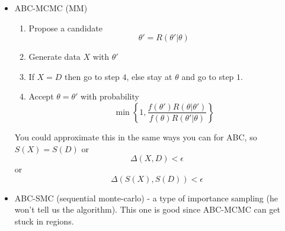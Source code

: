 \documentclass{X:/Documents/Coding/Latex/myassignment}
\begin{document}
\begin{itemize}
\begin{itemize}
        \item ABC-MCMC (MM)
        \begin{enumerate}
            \item Propose a candidate 
            \[\theta' = R(\theta' | \theta)\]
            \item Generate data $X$ with $\theta'$ 
            \item If $X=D$ then go to step $4$, else stay at $\theta$ and go to step $1$.
            \item Accept $\theta=\theta'$ with probability
            \[\min\left\{1,\frac{f(\theta')R(\theta|\theta')}{f(\theta)R(\theta'|\theta)}\right\}\]
        \end{enumerate}
        You could approximate this in the same ways you can for ABC, so $S(X)=S(D)$ or 
        \[\Delta(X,D)<\epsilon\]
        or
        \[\Delta(S(X),S(D))<\epsilon\]
        \item ABC-SMC (sequential monte-carlo) - a type of importance sampling (he won't tell us the algorithm). This one is good since ABC-MCMC can get stuck in regions.
        
    \end{itemize}
\end{itemize}
\end{document}
